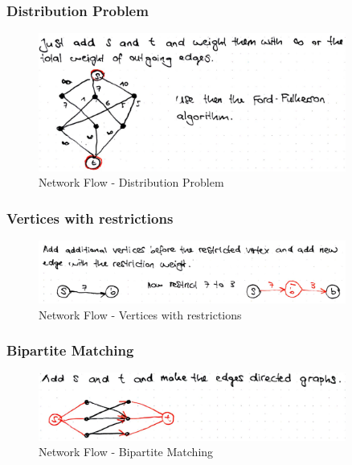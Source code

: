 \subsubsection{Distribution Problem}

\begin{figure}[H]
\centering
\includegraphics[width=0.9\textwidth]{figures/distributionProblem.png}
\caption{Network Flow - Distribution Problem}
\end{figure}

\subsubsection{Vertices with restrictions}

\begin{figure}[H]
\centering
\includegraphics[width=0.9\textwidth]{figures/restrictionModelling.png}
\caption{Network Flow - Vertices with restrictions}
\end{figure}

\subsubsection{Bipartite Matching}

\begin{figure}[H]
\centering
\includegraphics[width=0.9\textwidth]{figures/bipartiteMatching.png}
\caption{Network Flow - Bipartite Matching}
\end{figure}

